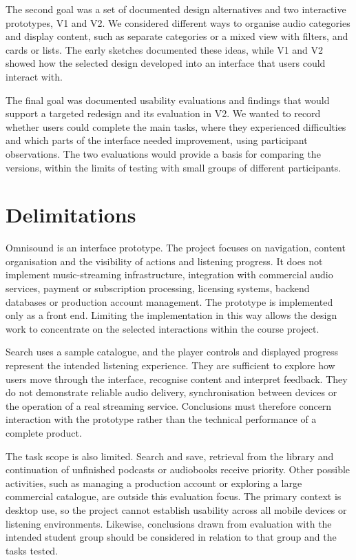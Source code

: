 The second goal was a set of documented design alternatives and two interactive prototypes, V1 and V2. We considered different ways to organise audio categories and display content, such as separate categories or a mixed view with filters, and cards or lists. The early sketches documented these ideas, while V1 and V2 showed how the selected design developed into an interface that users could interact with.

The final goal was documented usability evaluations and findings that would support a targeted redesign and its evaluation in V2. We wanted to record whether users could complete the main tasks, where they experienced difficulties and which parts of the interface needed improvement, using participant observations. The two evaluations would provide a basis for comparing the versions, within the limits of testing with small groups of different participants.

\section{Delimitations}
\label{sec:delimitations}

Omnisound is an interface prototype. The project focuses on navigation,
content organisation and the visibility of actions and listening progress.
It does not implement music-streaming infrastructure, integration with
commercial audio services, payment or subscription processing, licensing
systems, backend databases or production account management. The prototype
is implemented only as a front end. Limiting the implementation in this way
allows the design work to concentrate on the
selected interactions within the course project.

Search uses a sample catalogue, and the player controls and displayed progress
represent the intended listening experience. They are sufficient to explore
how users move through the interface, recognise content and interpret
feedback. They do not demonstrate reliable audio delivery, synchronisation
between devices or the operation of a real streaming service. Conclusions
must therefore concern interaction with the prototype rather than the
technical performance of a complete product.

The task scope is also limited. Search and save, retrieval from the library
and continuation of unfinished podcasts or audiobooks receive priority.
Other possible activities, such as managing a production account or exploring
a large commercial catalogue, are outside this evaluation focus. The primary
context is desktop use, so the project cannot establish usability across all
mobile devices or listening environments. Likewise, conclusions drawn from
evaluation with the intended student group should be considered in relation
to that group and the tasks tested.

